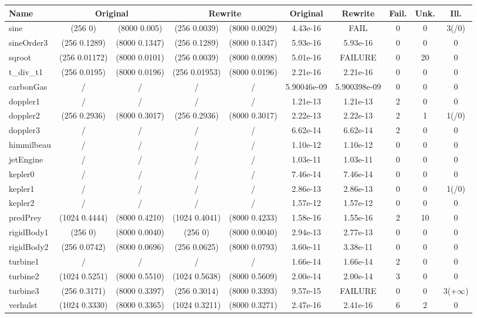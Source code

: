 \documentclass[runningheads]{llncs}
\begin{document}
\begin{table}[h]
\begin{adjustbox}{center}
\begin{tabular}{l|c|c|c|c|c|c|c|c|c|}
		\cmidrule{2-5}\cmidrule{5-6}\cmidrule{6-10}
		Name     & \multicolumn{2}{|c|}{Original}   & \multicolumn{2}{|c|}{Rewrite}  & Original & Rewrite & Fail. & Unk. &Ill. \\
		\midrule
		sine &(256 0) & (8000 0.005) &(256 0.0039) & (8000 0.0029)&4.43e-16& FAIL& 0& 0& 3(/0)\\
		sineOrder3 &(256 0.1289) & (8000 0.1347)&(256 0.1289) &(8000 0.1347)& 5.93e-16& 5.93e-16& 0& 0& 0\\
		sqroot&(256 0.01172)& (8000 0.0101)&(256 0.0039) &(8000 0.0098) & 5.01e-16& FAILURE& 0& 20& 0\\
		t\_div\_t1 &(256 0.0195)& (8000 0.0196)&(256 0.01953)& (8000 0.0196)& 2.21e-16 & 2.21e-16 & 0& 0& 0\\
		carbonGas &/&/&/&/& 5.90046e-09 & 5.900398e-09& 0& 0& 0\\
		doppler1 &/&/&/&/& 1.21e-13 & 1.21e-13& 2& 0& 0\\
		doppler2 &(256 0.2936) &(8000 0.3017)&(256 0.2936) &(8000 0.3017)& 2.22e-13 & 2.22e-13 & 2& 1& 1(/0)\\
		doppler3 &/&/&/&/& 6.62e-14 & 6.62e-14 & 2& 0& 0\\
		himmilbeau &/&/&/&/& 1.10e-12 & 1.10e-12 & 0& 0& 0\\
		jetEngine &/&/&/&/& 1.03e-11 & 1.03e-11 & 0& 0& 0\\
		kepler0 &/&/&/&/& 7.46e-14 & 7.46e-14 & 0& 0& 0\\
		kepler1 &/&/&/&/& 2.86e-13 & 2.86e-13 & 0& 0& 1(/0)\\
		kepler2 &/&/&/&/& 1.57e-12 & 1.57e-12 & 0& 0& 0\\
		predPrey &(1024 0.4444) &(8000 0.4210)&(1024 0.4041)& (8000 0.4233)& 1.58e-16 & 1.55e-16 & 2& 10& 0\\
		rigidBody1 &(256 0) &(8000 0.0040)&(256 0) &(8000 0.0040)& 2.94e-13 & 2.77e-13 & 0& 0& 0\\
		rigidBody2 &(256 0.0742) &(8000 0.0696)&(256 0.0625) &(8000 0.0793)& 3.60e-11 & 3.38e-11 & 0& 0& 0\\
		turbine1 &/&/&/&/& 1.66e-14 & 1.66e-14 & 2& 0& 0\\
		turbine2 &(1024 0.5251)& (8000 0.5510)&(1024 0.5638) &(8000 0.5609)& 2.00e-14 & 2.00e-14 & 3& 0& 0\\
		turbine3 &(256 0.3171) &(8000 0.3397)&(256 0.3014) &(8000 0.3393)& 9.57e-15& FAILURE& 0& 0& 3(+$\infty$)\\
		verhulst &(1024 0.3330) &(8000 0.3365)&(1024 0.3211) &(8000 0.3271)& 2.47e-16 & 2.41e-16 & 6& 2& 0\\

\end{tabular}
\end{adjustbox}
\end{table}
\end{document}
